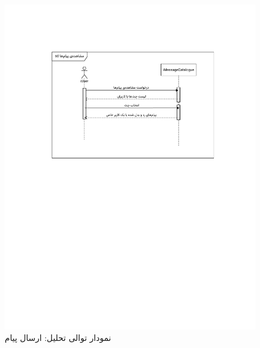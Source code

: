 \begin{figure}[ht!]
	\centering
	\includegraphics[scale=0.8, page=2]{figs/OOD-Sequence-chat.pdf}
	\caption{نمودار توالی تحلیل: ارسال پیام}
\end{figure}
\FloatBarrier
\newpage



